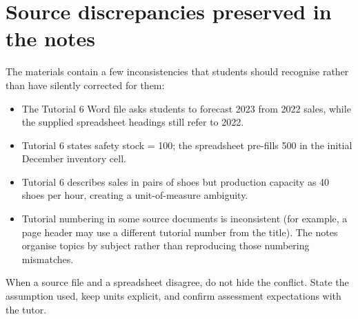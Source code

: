 \section*{Source discrepancies preserved in the notes}

The materials contain a few inconsistencies that students should recognise rather than have silently corrected for them:

\begin{itemize}
  \item The Tutorial 6 Word file asks students to forecast 2023 from 2022 sales, while the supplied spreadsheet headings still refer to 2022.
  \item Tutorial 6 states safety stock = 100; the spreadsheet pre-fills 500 in the initial December inventory cell.
  \item Tutorial 6 describes sales in pairs of shoes but production capacity as 40 shoes per hour, creating a unit-of-measure ambiguity.
  \item Tutorial numbering in some source documents is inconsistent (for example, a page header may use a different tutorial number from the title). The notes organise topics by subject rather than reproducing those numbering mismatches.
\end{itemize}

\begin{keyidea}
When a source file and a spreadsheet disagree, do not hide the conflict. State the assumption used, keep units explicit, and confirm assessment expectations with the tutor.
\end{keyidea}
